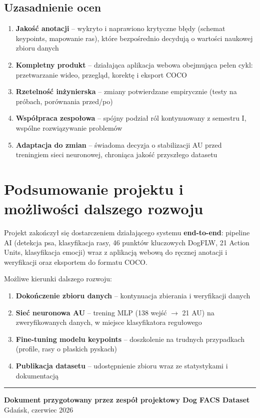 \documentclass[11pt,a4paper]{article}
\begin{document}
\subsection{Uzasadnienie ocen}
\begin{enumerate}[leftmargin=3.2em]
  \item \textbf{Jakość anotacji} -- wykryto i naprawiono krytyczne błędy
        (schemat keypoints, mapowanie ras), które bezpośrednio decydują
        o wartości naukowej zbioru danych
  \item \textbf{Kompletny produkt} -- działająca aplikacja webowa obejmująca pełen
        cykl: przetwarzanie wideo, przegląd, korektę i eksport COCO
  \item \textbf{Rzetelność inżynierska} -- zmiany potwierdzane empirycznie
        (testy na próbach, porównania przed/po)
  \item \textbf{Współpraca zespołowa} -- spójny podział ról kontynuowany
        z semestru I, wspólne rozwiązywanie problemów
  \item \textbf{Adaptacja do zmian} -- świadoma decyzja o stabilizacji AU przed
        treningiem sieci neuronowej, chroniąca jakość przyszłego datasetu
\end{enumerate}

\section{Podsumowanie projektu i możliwości dalszego rozwoju}

Projekt zakończył się dostarczeniem działającego systemu \textbf{end-to-end}:
pipeline AI (detekcja psa, klasyfikacja rasy, 46 punktów kluczowych DogFLW,
21 Action Units, klasyfikacja emocji) wraz z aplikacją webową do ręcznej anotacji
i weryfikacji oraz eksportem do formatu COCO.

Możliwe kierunki dalszego rozwoju:
\begin{enumerate}[leftmargin=3.2em]
  \item \textbf{Dokończenie zbioru danych} -- kontynuacja zbierania i weryfikacji danych
  \item \textbf{Sieć neuronowa AU} -- trening MLP (138 wejść $\rightarrow$ 21 AU)
        na zweryfikowanych danych, w miejsce klasyfikatora regułowego
  \item \textbf{Fine-tuning modelu keypoints} -- doszkolenie na trudnych przypadkach
        (profile, rasy o płaskich pyskach)
  \item \textbf{Publikacja datasetu} -- udostępnienie zbioru wraz ze statystykami
        i dokumentacją
\end{enumerate}

\vspace{1.5em}
\noindent\rule{\textwidth}{0.4pt}
\begin{center}
\textbf{Dokument przygotowany przez zespół projektowy Dog FACS Dataset}\\
Gdańsk, czerwiec 2026
\end{center}
\end{document}
